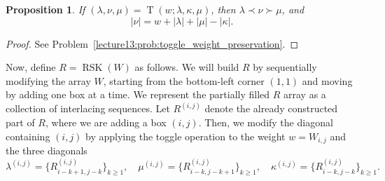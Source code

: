 \documentclass[letterpaper,11pt,oneside,reqno]{book}
\numberwithin{equation}{chapter}  %
\newtheorem{proposition}{Proposition}[chapter]  %
\theoremstyle{definition}
\begin{document}
\begin{proposition}
	\label{lecture13:prop:toggle_weight_preservation}
	If $(\lambda,\nu,\mu)=\operatorname{T}(w;\lambda,\kappa,\mu)$, then
	$\lambda\prec\nu\succ \mu$, and
	\begin{equation*}
		|\nu|=w+|\lambda|+|\mu|-|\kappa|.
	\end{equation*}
\end{proposition}
\begin{proof}
	See Problem~\ref{lecture13:prob:toggle_weight_preservation}.
\end{proof}


Now, define $R=\operatorname{RSK}(W)$ as follows.
We will build $R$
by sequentially modifying the array $W$,
starting from the bottom-left corner $(1,1)$ and moving
by adding one box at a time.
We represent the partially filled $R$ array as a collection of interlacing sequences.
Let $R^{(i,j)}$ denote the already constructed part of $R$, where we are adding a
box $(i,j)$. Then, we modify the diagonal containing
$(i,j)$ by applying the toggle operation to the weight $w=W_{i,j}$ and the three diagonals
\begin{equation*}
	\lambda^{(i,j)} = \{R^{(i,j)}_{i-k+1,j-k}\}_{k\ge1}, \quad
	\mu^{(i,j)} = \{R^{(i,j)}_{i-k,j-k+1}\}_{k\ge1}, \quad
	\kappa^{(i,j)} = \{R^{(i,j)}_{i-k,j-k}\}_{k\ge1}.
\end{equation*}
\end{document}
